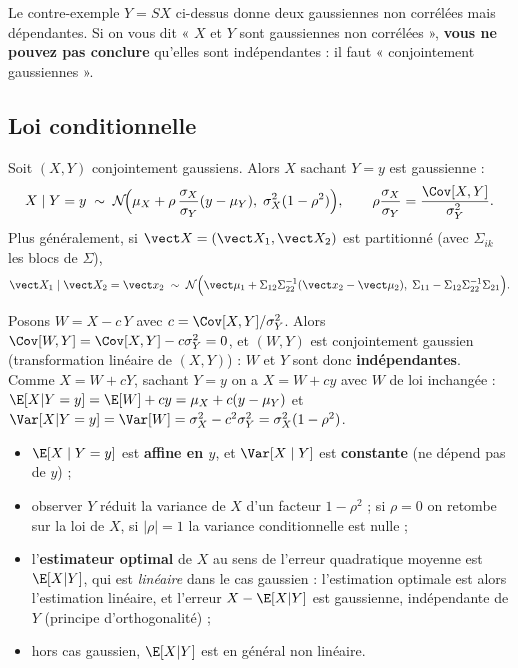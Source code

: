 \documentclass[11pt,a4paper,openany]{book}
\begin{document}
\begin{warnbox}[title={L'hypothèse « conjointement » est indispensable}]
Le contre-exemple $Y = SX$ ci-dessus donne deux gaussiennes non corrélées mais dépendantes. Si on
vous dit « $X$ et $Y$ sont gaussiennes non corrélées », \textbf{vous ne pouvez pas conclure}
qu'elles sont indépendantes : il faut « conjointement gaussiennes ».
\end{warnbox}

\subsection{Loi conditionnelle}

\begin{thmbox}[title={La loi conditionnelle est gaussienne}]
Soit $(X,Y)$ conjointement gaussiens. Alors $X$ sachant $Y=y$ est gaussienne :
\[
X\mid Y=y \;\sim\;\mathcal{N}\!\Big(\mu_X + \rho\,\frac{\sigma_X}{\sigma_Y}(y-\mu_Y),\;
\sigma_X^2(1-\rho^2)\Big),
\qquad \rho\frac{\sigma_X}{\sigma_Y} = \frac{\Cov[X,Y]}{\sigma_Y^2}.
\]
Plus généralement, si $\vect X = (\vect X_1,\vect X_2)$ est partitionné (avec $\Sigma_{ik}$ les
blocs de $\Sigma$),
\[
\vect X_1\mid\vect X_2=\vect x_2 \;\sim\; \mathcal{N}\Big(\vect\mu_1 +
\Sigma_{12}\Sigma_{22}^{-1}(\vect x_2-\vect\mu_2),\;
\Sigma_{11}-\Sigma_{12}\Sigma_{22}^{-1}\Sigma_{21}\Big).
\]
\end{thmbox}

\begin{proofbox}[title={Idée de la preuve (cas scalaire)}]
Posons $W = X - c\,Y$ avec $c = \Cov[X,Y]/\sigma_Y^2$. Alors $\Cov[W,Y] = \Cov[X,Y] -
c\sigma_Y^2 = 0$, et $(W,Y)$ est conjointement gaussien (transformation linéaire de $(X,Y)$) :
$W$ et $Y$ sont donc \textbf{indépendantes}. Comme $X = W + cY$, sachant $Y=y$ on a $X = W + cy$
avec $W$ de loi inchangée : $\E[X|Y=y] = \E[W] + cy = \mu_X + c(y-\mu_Y)$ et $\Var[X|Y=y] =
\Var[W] = \sigma_X^2 - c^2\sigma_Y^2 = \sigma_X^2(1-\rho^2)$.
\end{proofbox}

\begin{keybox}[title={Ce qu'il faut retenir}]
\begin{itemize}
\item $\E[X\mid Y=y]$ est \textbf{affine en $y$}, et $\Var[X\mid Y]$ est \textbf{constante}
  (ne dépend pas de $y$) ;
\item observer $Y$ réduit la variance de $X$ d'un facteur $1-\rho^2$ ; si $\rho=0$ on retombe
  sur la loi de $X$, si $|\rho|=1$ la variance conditionnelle est nulle ;
\item l'\textbf{estimateur optimal} de $X$ au sens de l'erreur quadratique moyenne est $\E[X|Y]$,
  qui est \emph{linéaire} dans le cas gaussien : l'estimation optimale est alors
  l'estimation linéaire, et l'erreur $X-\E[X|Y]$ est gaussienne, indépendante de $Y$
  (principe d'orthogonalité) ;
\item hors cas gaussien, $\E[X|Y]$ est en général non linéaire.
\end{itemize}
\end{keybox}
\end{document}
